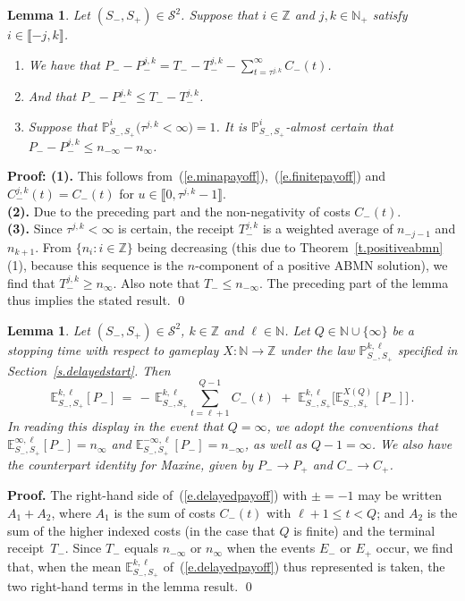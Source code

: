 \documentclass[letterpaper,11pt,oneside,reqno]{amsbook}
\newcommand{\PP}{\ensuremath{\mathbb{P}}}
\newcommand{\N}{\ensuremath{\mathbb{N}}}
\newcommand{\Z}{\ensuremath{\mathbb{Z}}}
\newcommand{\E}[0]{\mathbb{E}}
\numberwithin{figure}{chapter}
\newtheorem{lemma}[theorem]{Lemma}
\theoremstyle{definition}
\theoremstyle{definition}
\theoremstyle{definition}
\theoremstyle{definition}
\theoremstyle{definition}
\newcommand{\mc}{\mathcal}
\newcommand{\nwithzero}{\N}
\newcommand{\nwithoutzero}{\N_+}
\newcommand\pgameplay[3]{\PP^{#3}_{#1,#2}}
\newcommand\egameplay[3]{\E^{#3}_{#1,#2}}
\newcommand{\abmnmacspace}{\textrm{ABMN} }
\begin{document}
\begin{lemma}\label{l.couplingproperties}
Let  $(S_-,S_+) \in \mc{S}^2$. Suppose that $i \in \Z$ and $j,k \in \nwithoutzero$ satisfy $i \in \llbracket -j,k \rrbracket$.
\begin{enumerate}
\item We have that $P_-  - P^{j,k}_- = T_- - T^{j,k}_- - \sum_{t = \tau^{j,k}}^\infty C_-(t)$.
\item And that  $P_-  - P^{j,k}_- \leq T_- - T^{j,k}_-$.
\item Suppose that $\PP_{S_-,S_+}^i \big( \tau^{j,k} < \infty \big) = 1$.   It is  $\PP_{S_-,S_+}^i$-almost certain that  $P_-  - P^{j,k}_- \leq n_{-\infty} - n_\infty$.
\end{enumerate}
  \end{lemma}
{\bf Proof: (1).} This follows from~(\ref{e.minapayoff}),~(\ref{e.finitepayoff}) and $C^{j,k}_-(t) = C_-(t)$ for $u \in \llbracket 0, \tau^{j,k}-1 \rrbracket$. \\
{\bf (2).}  Due to the preceding part and the non-negativity of costs $C_-(t)$. \\
{\bf (3).}  Since  $\tau^{j,k} < \infty$ is certain,
the receipt $T^{j,k}_-$ is a weighted average of $n_{-j-1}$ and $n_{k+1}$. From $\big\{ n_i: i \in \Z \big\}$ being decreasing (this due to Theorem~\ref{t.positiveabmn}(1), because this sequence is the $n$-component of a positive \abmnmacspace solution),
we find that $T^{j,k}_- \geq n_\infty$. Also note that $T_- \leq n_{-\infty}$. The preceding part of the lemma thus implies the stated result.  \qed



\begin{lemma}\label{l.stopping}
Let $(S_-,S_+) \in \mc{S}^2$, $k \in \Z$ and $\ell \in \nwithzero$.
Let $Q \in \nwithzero \cup \{ \infty \}$ be a stopping time with respect to gameplay $X: \nwithzero \to \Z$ under the law $\pgameplay{S_-}{S_+}{k,\ell}$ specified in Section~\ref{s.delayedstart}. Then
\begin{equation}\label{e.stopping}
\egameplay{S_-}{S_+}{k,\ell} [P_-] \, = \,  - \, \egameplay{S_-}{S_+}{k,\ell}  \sum_{t=\ell + 1}^{Q - 1} C_-(t) \,\, + \,\, 
  \egameplay{S_-}{S_+}{k,\ell} \big[ \egameplay{S_-}{S_+}{X(Q)} [P_-] \big] \, . 
\end{equation}
In reading this display in the event that $Q = \infty$, we adopt the conventions that  $\egameplay{S_-}{S_+}{\infty,\ell}[P_-] = n_\infty$ and   $\egameplay{S_-}{S_+}{-\infty,\ell}[P_-] = n_{-\infty}$,
as well as $Q-1 = \infty$. We also have the counterpart identity for Maxine, given by $P_- \to P_+$ and $C_- \to C_+$.
\end{lemma}
{\bf Proof.} The right-hand side of~(\ref{e.delayedpayoff}) with $\pm = -1$ may be written $A_1 + A_2$, where $A_1$ is the sum of costs $C_-(t)$ with $\ell + 1 \leq t < Q$; and $A_2$ is the sum of the higher indexed costs (in the case that $Q$ is finite) and the terminal receipt~$T_-$. 
Since $T_-$ equals $n_{-\infty}$ or $n_\infty$
when the events $E_-$ or $E_+$ occur, we find that, when the mean 
$\egameplay{S_-}{S_+}{k,\ell}$ of~(\ref{e.delayedpayoff}) thus represented is taken, the two right-hand terms in the lemma result. \qed
\end{document}
